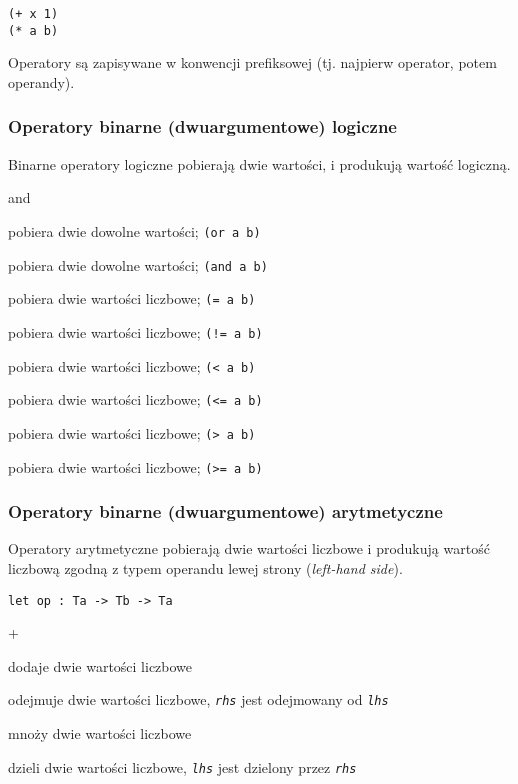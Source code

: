 \begin{lstlisting}
(+ x 1)
(* a b)
\end{lstlisting}

Operatory są zapisywane w konwencji prefiksowej (tj. najpierw operator, potem operandy).

\subsubsection{Operatory binarne (dwuargumentowe) logiczne}

Binarne operatory logiczne pobierają dwie wartości, i produkują wartość logiczną.

\begin{labeling}{and}
    \item[\texttt{or}] pobiera dwie dowolne wartości; \texttt{(or a b)}
    \item[\texttt{and}] pobiera dwie dowolne wartości; \texttt{(and a b)}
    \item[\texttt{=}] pobiera dwie wartości liczbowe; \texttt{(= a b)}
    \item[\texttt{!=}] pobiera dwie wartości liczbowe; \texttt{(!= a b)}
    \item[\texttt{<}] pobiera dwie wartości liczbowe; \texttt{(< a b)}
    \item[\texttt{<=}] pobiera dwie wartości liczbowe; \texttt{(<= a b)}
    \item[\texttt{>}] pobiera dwie wartości liczbowe; \texttt{(> a b)}
    \item[\texttt{>=}] pobiera dwie wartości liczbowe; \texttt{(>= a b)}
\end{labeling}

\subsubsection{Operatory binarne (dwuargumentowe) arytmetyczne}

Operatory arytmetyczne pobierają dwie wartości liczbowe i produkują wartość liczbową zgodną z typem operandu
lewej strony (\emph{left-hand side}).

\begin{lstlisting}
let op : Ta -> Tb -> Ta
\end{lstlisting}

\begin{labeling}{+}
    \item[\texttt{+}] dodaje dwie wartości liczbowe
    \item[\texttt{-}] odejmuje dwie wartości liczbowe, \emph{\texttt{rhs}} jest odejmowany od
        \emph{\texttt{lhs}}
    \item[\texttt{*}] mnoży dwie wartości liczbowe
    \item[\texttt{/}] dzieli dwie wartości liczbowe, \emph{\texttt{lhs}} jest dzielony przez
        \emph{\texttt{rhs}}
\end{labeling}

